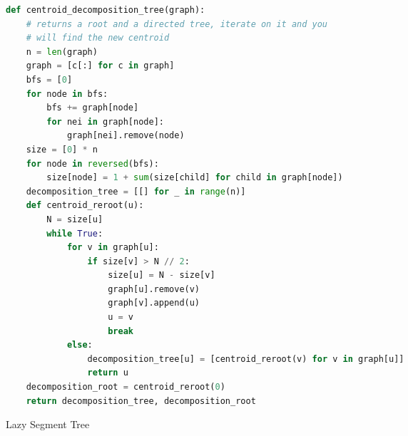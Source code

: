 \documentclass[10pt,landscape, a4paper]{article}
\begin{document}
\begin{multicols*}{3}
\begin{lstlisting}[language=Python]
def centroid_decomposition_tree(graph):
    # returns a root and a directed tree, iterate on it and you
    # will find the new centroid
    n = len(graph)
    graph = [c[:] for c in graph]
    bfs = [0]
    for node in bfs:
        bfs += graph[node]
        for nei in graph[node]:
            graph[nei].remove(node)
    size = [0] * n
    for node in reversed(bfs):
        size[node] = 1 + sum(size[child] for child in graph[node])
    decomposition_tree = [[] for _ in range(n)]
    def centroid_reroot(u):
        N = size[u]
        while True:
            for v in graph[u]:
                if size[v] > N // 2:
                    size[u] = N - size[v]
                    graph[u].remove(v)
                    graph[v].append(u)
                    u = v
                    break
            else:
                decomposition_tree[u] = [centroid_reroot(v) for v in graph[u]]
                return u
    decomposition_root = centroid_reroot(0)
    return decomposition_tree, decomposition_root
\end{lstlisting}

Lazy Segment Tree
\begin{lstlisting}[language=Python]


\end{lstlisting}
\end{multicols*}
\end{document}
